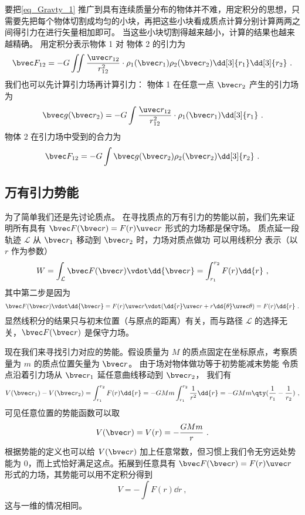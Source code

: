 要把\autoref{eq_Gravty_1} 推广到具有连续质量分布的物体并不难，用定积分的思想，只需要先把每个物体切割成均匀的小块，再把这些小块看成质点计算分别计算两两之间得引力在进行矢量相加即可。 当这些小块切割得越来越小，计算的结果也越来越精确。 用定积分表示物体 1 对 物体 2 的引力为
\begin{equation}
\bvec F_{12} = -G\iint \frac{\uvec r_{12}}{r_{12}^2}  \cdot \rho_1(\bvec r_1) \rho_2(\bvec r_2) \dd[3]{r_1} \dd[3]{r_2}~.
\end{equation}
我们也可以先计算引力场再计算引力： 物体 1 在任意一点 $\bvec r_2$ 产生的引力场为
\begin{equation}
\bvec g(\bvec r_2) = -G\int \frac{\uvec r_{12}}{r_{12}^2}  \cdot \rho_1(\bvec r_1) \dd[3]{r_1}~.
\end{equation}
物体 2 在引力场中受到的合力为
\begin{equation}
\bvec F_{12} = -G\int \bvec g(\bvec r_2)\rho_2(\bvec r_2) \dd[3]{r_2}~.
\end{equation}

\subsection{万有引力势能}

为了简单我们还是先讨论质点。 在寻找质点的万有引力的势能以前，我们先来证明所有具有 $\bvec F(\bvec r) = F(r) \uvec r$ 形式的力场都是保守场。 质点延一段轨迹 $\mathcal{L}$ 从 $\bvec r_1$ 移动到 $\bvec r_2$ 时，力场对质点做功 可以用线积分 表示（以 $r$ 作为参数）
\begin{equation}\label{eq_Gravty_3}
W = \int_\mathcal{L} \bvec F(\bvec r) \vdot \dd{\bvec r} = \int_{r_1}^{r_2} F(r) \dd{r}~,
\end{equation}
其中第二步是因为
\begin{equation}
\bvec F(\bvec r) \vdot \dd{\bvec r} = F(r)\uvec  r \vdot (\dd{r} \uvec  r + r\dd{\theta} \uvec \theta ) = F(r) \dd{r}~.
\end{equation}
显然线积分的结果只与初末位置（与原点的距离）有关，而与路径 $\mathcal{L}$ 的选择无关，$\bvec F(\bvec r)$ 是保守力场。

现在我们来寻找引力对应的势能。假设质量为 $M$ 的质点固定在坐标原点，考察质量为 $m$ 的质点位置矢量为 $\bvec r$。 由于场对物体做功等于初势能减末势能
令质点沿着引力场从 ${\bvec r_1}$ 延任意曲线移动到 $\bvec r_2$， 我们有
\begin{equation}
V(\bvec r_1) - V(\bvec r_2) = \int_{r_1}^{r_2} F(r) \dd{r} =  - GMm\int_{r_1}^{r_2} \frac{1}{r^2} \dd{r}  =  - GMm \qty( \frac{1}{r_1} - \frac{1}{r_2} )~,
\end{equation}
可见任意位置的势能函数可以取
\begin{equation}
V(\bvec r) = V(r) = - \frac{GMm}{r}~.
\end{equation}
根据势能的定义也可以给 $V(\bvec r)$ 加上任意常数，但习惯上我们令无穷远处势能为 0，而上式恰好满足这点。拓展到任意具有 $\bvec F(\bvec r) = F(r)\uvec r$ 形式的力场，其势能可以用不定积分得到
\begin{equation}\label{eq_Gravty_7}
V = -\int F(r) \dd{r}~,
\end{equation}
这与一维的情况相同。%

